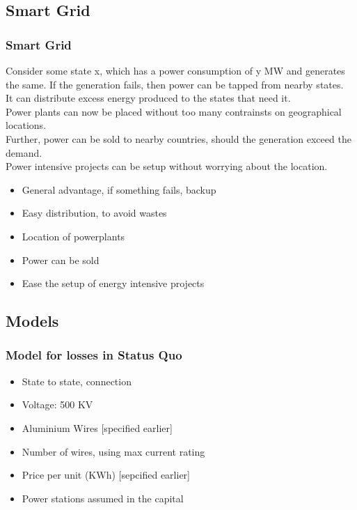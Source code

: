 \documentclass{beamer}
\begin{document}
	\subsection{Smart Grid}
		\begin{frame}
			\frametitle{Smart Grid}
				Consider some state x, which has a power consumption of y MW and generates the same. If the generation fails, then power can be tapped from nearby states.\\
				It can distribute excess energy produced to the states that need it.\\				
				Power plants can now be placed without too many contrainsts on geographical locations.\\
				Further, power can be sold to nearby countries, should the generation exceed the demand.\\
				Power intensive projects can be setup without worrying about the location.\\
				\begin{itemize}					
					\item General advantage, if something fails, backup
					\item Easy distribution, to avoid wastes
					\item Location of powerplants
					\item Power can be sold
					\item Ease the setup of energy intensive projects
				\end{itemize}

		\end{frame}
	\subsection{Models}
		\begin{frame}
			\frametitle{Model for losses in Status Quo}
				\begin{itemize}
					\item State to state, connection
					\item Voltage: 500 KV
					\item Aluminium Wires [specified earlier]
					\item Number of wires, using max current rating
					\item Price per unit (KWh) [sepcified earlier]
					\item Power stations assumed in the capital
				\end{itemize}
		\end{frame}
\end{document}
